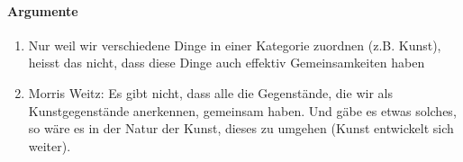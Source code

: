 \documentclass[../main.tex]{subfiles}
\begin{document}
\paragraph{Argumente}
\begin{enumerate}
	\item Nur weil wir verschiedene Dinge in einer Kategorie zuordnen (z.B. Kunst), heisst das nicht, dass diese Dinge auch effektiv Gemeinsamkeiten haben
	\item Morris Weitz: Es gibt nicht, dass alle die Gegenstände, die wir als Kunstgegenstände anerkennen, gemeinsam haben. Und gäbe es etwas solches, so wäre es in der Natur der Kunst, dieses zu umgehen (Kunst entwickelt sich weiter).
\end{enumerate}
\end{document}
